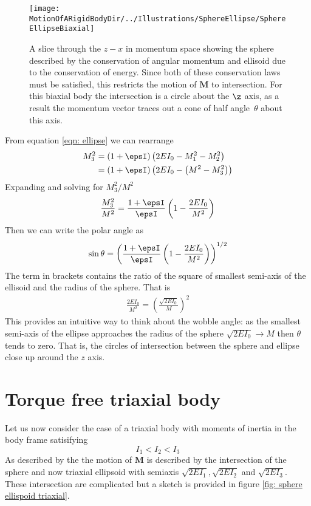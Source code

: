 \documentclass[/home/greg/Thesis/main/main.tex]{subfiles}
\begin{document}
\begin{figure}[htb]
\centering
\texttt{[image: \\MotionOfARigidBodyDir/../Illustrations/SphereEllipse/SphereEllipseBiaxial]}
\caption{A slice through the $z-x$ in momentum space showing the sphere described
by the conservation of angular momentum and ellisoid due to the conservation of
energy. Since both of these conservation laws must be satisfied, this restricts
the motion of $\mathbf{M}$ to intersection. For this biaxial body the intersection
is a circle about the $\z$ axis, as a result the momentum vector traces out a
cone of half angle~$\theta$ about this axis.}
\label{fig: sphere ellispod biaxial}
\end{figure}

From equation \eqref{eqn: ellipse} we can rearrange
\begin{align}
    M_{3}^{2} & = (1+\epsI)\left(2EI_{0} - M_{1}^{2} - M_{2}^{2}\right) \\
              & = (1+\epsI)\left(2EI_{0} - \left(M^{2} - M_{3}^{2}\right)\right)
\end{align}
Expanding and solving for $M_{3}^{2}/M^{2}$ 
\begin{align}
    \frac{M_{3}^{2}}{M^{2}} = \frac{1+\epsI}{\epsI}\left(1 - \frac{2EI_{0}}{M^{2}}\right)
\end{align}
Then we can write the polar angle as
\begin{equation}
    \sin\theta = \left(\frac{1+\epsI}{\epsI}\left(1 - \frac{2EI_{0}}{M^{2}}\right)\right)^{1/2}
    \label{eqn: sin theta biaxial}
\end{equation}
The term in brackets contains the ratio of the square of smallest semi-axis of
the ellisoid and the radius of the sphere. That is
\begin{align}
    \frac{2EI_{0}}{M^{2}} = \left(\frac{\sqrt{2EI_{0}}}{M}\right)^{2}
\end{align}
This provides an intuitive way to think about the wobble angle: as the smallest
semi-axis of the ellipse approaches the radius of the sphere $\sqrt{2EI_{0}}\rightarrow M$
then $\theta$ tends to zero. That is, the circles of intersection between the
sphere and ellipse close up around the $z$ axis.

\section{Torque free triaxial body}
Let us now consider the case of a triaxial body with moments of inertia in the
body frame satisifying
\begin{equation}
    I_{1} < I_{2} < I_{3}
\end{equation}
As described by the \citet{Landau1969} the motion of $\mathbf{M}$ is
described by the intersection of the sphere and now triaxial ellipsoid
with semiaxis $\sqrt{2EI_{1}}, \sqrt{2EI_{2}}$ and $\sqrt{2EI_{3}}$. These 
intersection are complicated but a sketch is provided in figure \ref{fig: sphere ellispoid triaxial}.
\end{document}
